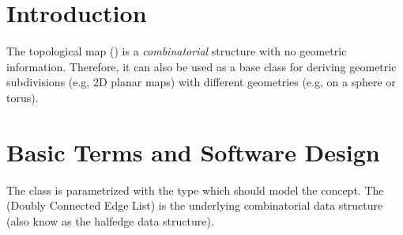 
\def\Ipe#1{\def\IPEfile{#1}}

\renewcommand{\Re}{{\rm I\!\hspace{-0.025em} R}}
\newcommand{\normal}[1]{\eta_{#1}}
\newenvironment{dfn}{{\vspace*{1ex} \noindent \bf Definition }}{\vspace*{1ex}}
\newcommand{\bigdef}[2]{\index{#1}\begin{dfn} {\rm #2} \end{dfn}}
\newenvironment{proof}{{\em Proof:}}{\hfill{\hfill\rule{2mm}{2mm}}}

\newcommand{\comment}[1]{{\sf * #1 *}}
\newcommand{\ncomment}[1]{\noindent {\sf * #1 * }}

\newcommand{\intsupplanes}{P} 
\def\C{{\cal C}}
\def\G{{\cal G}}
\def\F{{\cal F}}
\def\I{{\cal I}}
\def\U{{\cal U}}
\def\M{{\cal M}}
\def\eps{{\varepsilon}}
\def\bd{{\partial}}
\def\dm{{\cal D}}
\newcommand{\Section}[1]{Section~{\protect\ref{#1}}}
\newcommand{\Chapter}[1]{Chapter~{\protect\ref{#1}}}

\ccParDims



\section{Introduction}
\label{TPM_sec:intro}
   The topological map () is a {\em
   combinatorial} structure with no geometric information. Therefore,
   it can also be used as a base class for deriving geometric
   subdivisions (e.g, 2D planar maps) with different geometries (e.g,
   on a sphere or torus). 

\section{Basic Terms and Software Design}
   The class is parametrized with the  type which should
   model the  concept. The  (Doubly
   Connected Edge List) is the underlying combinatorial data structure
   (also know as the halfedge data structure).

